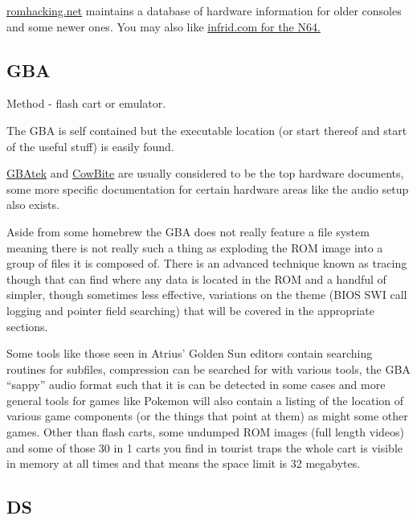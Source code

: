 \documentclass[
]{book}
\begin{document}
\href{http://www.romhacking.net/?page=documents\&category=12\&platform=\&game=\&author=\&perpage=20\&level=\&title=\&desc=\&docsearch=Go}{romhacking.net} maintains a database of hardware information for older consoles and some newer ones. You may also like \href{http://infrid.com/rcp64/documents.php}{infrid.com for the N64.}

\hypertarget{gba}{%
\subsection{GBA}\label{gba}}

Method - flash cart or emulator.

The GBA is self contained but the executable location (or start thereof and start of the useful stuff) is easily found.

\href{http://problemkaputt.de/gbatek.htm}{GBAtek} and \href{http://www.cs.rit.edu/~tjh8300/CowBite/CowBiteSpec.htm}{CowBite} are usually considered to be the top hardware documents, some more specific documentation for certain hardware areas like the audio setup also exists.

Aside from some homebrew the GBA does not really feature a file system meaning there is not really such a thing as exploding the ROM image into a group of files it is composed of. There is an advanced technique known as tracing though that can find where any data is located in the ROM and a handful of simpler, though sometimes less effective, variations on the theme (BIOS SWI call logging and pointer field searching) that will be covered in the appropriate sections.

Some tools like those seen in Atrius' Golden Sun editors contain searching routines for subfiles, compression can be searched for with various tools, the GBA ``sappy'' audio format such that it is can be detected in some cases and more general tools for games like Pokemon will also contain a listing of the location of various game components (or the things that point at them) as might some other games. Other than flash carts, some undumped ROM images (full length videos) and some of those 30 in 1 carts you find in tourist traps the whole cart is visible in memory at all times and that means the space limit is 32 megabytes.

\hypertarget{ds}{%
\subsection{DS}\label{ds}}
\end{document}
